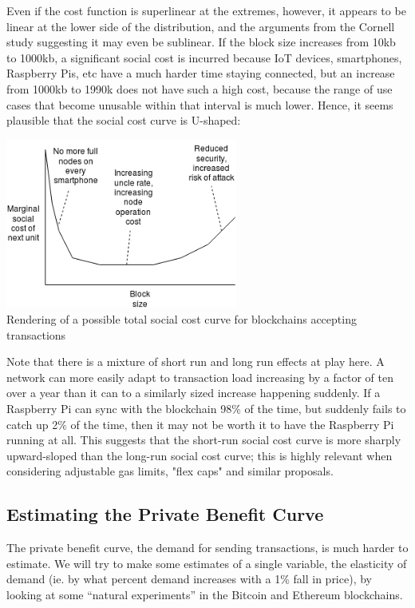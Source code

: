 \documentclass[12pt, final]{article}
\begin{document}
Even if the cost function is superlinear at the extremes, however, it appears to be linear at the lower side of the distribution, and the arguments from the Cornell study suggesting it may even be sublinear. If the block size increases from 10kb to 1000kb, a significant social cost is incurred because IoT devices, smartphones, Raspberry Pis, etc have a much harder time staying connected, but an increase from 1000kb to 1990k does not have such a high cost, because the range of use cases that become unusable within that interval is much lower. Hence, it seems plausible that the social cost curve is U-shaped:

\begin{center}
\includegraphics[width=3in]{total_social_cost.png} \\
Rendering of a possible total social cost curve for blockchains accepting transactions
\label{fig:three}
\end{center}

Note that there is a mixture of short run and long run effects at play here. A network can more easily adapt to transaction load increasing by a factor of ten over a year than it can to a similarly sized increase happening suddenly. If a Raspberry Pi can sync with the blockchain 98\% of the time, but suddenly fails to catch up 2\% of the time, then it may not be worth it to have the Raspberry Pi running at all. This suggests that the short-run social cost curve is more sharply upward-sloped than the long-run social cost curve; this is highly relevant when considering adjustable gas limits, "flex caps" and similar proposals.

\subsection{Estimating the Private Benefit Curve}

The private benefit curve, the demand for sending transactions, is much harder to estimate. We will try to make some estimates of a single variable, the elasticity of demand (ie. by what percent demand increases with a 1\% fall in price), by looking at some ``natural experiments'' in the Bitcoin and Ethereum blockchains.
\end{document}
